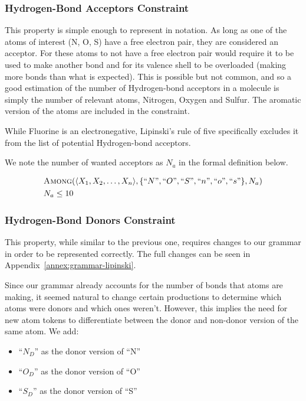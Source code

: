 \documentclass[../Document.tex]{subfiles}
\begin{document}
\subsubsection{Hydrogen-Bond Acceptors Constraint}
This property is simple enough to represent in \smiles notation. As long as one of the atoms of interest (\ie N, O, S) have a free electron pair, they are considered an acceptor. For these atoms to not have a free electron pair would require it to be used to make another bond and for its valence shell to be overloaded (\ie making more bonds than what is expected). This is possible but not common, and so a good estimation of the number of Hydrogen-bond acceptors in a molecule is simply the number of relevant atoms, \ie Nitrogen, Oxygen and Sulfur.
The aromatic version of the atoms are included in the constraint.

While Fluorine is an electronegative, Lipinski's rule of five specifically excludes it from the list of potential Hydrogen-bond acceptors\cite{LIPINSKI20013}.

We note the number of wanted acceptors as $N_a$ in the formal definition below.

\begin{align*}
    &\mbox{\sc Among}(\langle X_1, X_2, \ldots, X_n \rangle, \{``N",``O",``S",``n",``o",``s"\}, N_a)\\
    &N_a \leq 10
\end{align*}


\subsubsection{Hydrogen-Bond Donors Constraint}
This property, while similar to the previous one, requires changes to our grammar in order to be represented correctly. The full changes can be seen in Appendix~\ref{annex:grammar-lipinski}.

Since our grammar already accounts for the number of bonds that atoms are making, it seemed natural to change certain productions to determine which atoms were donors and which ones weren't. However, this implies the need for new atom tokens to differentiate between the donor and non-donor version of the same atom. We add:
\begin{itemize}
    \item ``$N_D$'' as the donor version of ``N''
    \item ``$O_D$'' as the donor version of ``O''
    \item ``$S_D$'' as the donor version of ``S''
\end{itemize}
\end{document}
